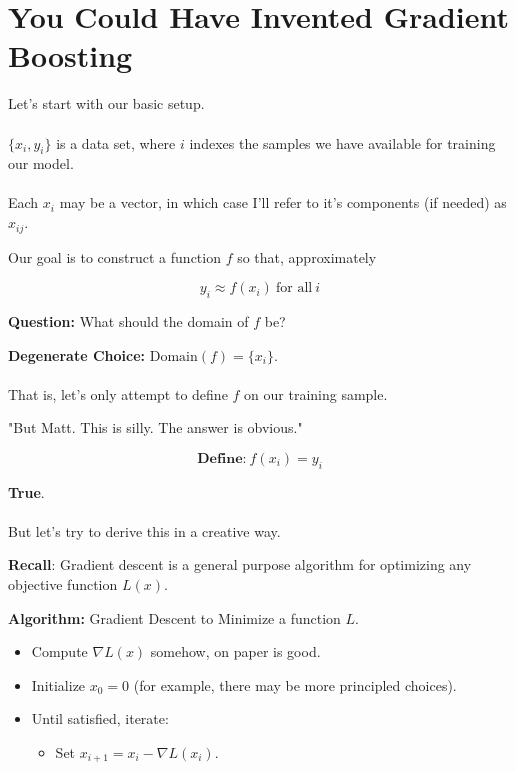 \section{You Could Have Invented Gradient Boosting}
%
\begin{frame}
Let's start with our basic setup.\\~\\

$\{ x_i, y_i \}$ is a data set, where $i$ indexes the samples we have available for training our model.\\~\\

Each $x_i$ may be a vector, in which case I'll refer to it's components (if needed) as $x_{ij}$.
\end{frame}
%
\begin{frame}
Our goal is to construct a function $f$ so that, approximately

$$ y_i \approx f(x_i) \ \text{for all} \ i $$

\end{frame}
%
\begin{frame}
\textbf{Question:} What should the domain of $f$ be?
\end{frame}
%
\begin{frame}
\textbf{Degenerate Choice:} $\text{Domain}(f) = \{x_i\}$.\\~\\

That is, let's only attempt to define $f$ on our training sample.
\end{frame}
%
\begin{frame}
\begin{center}
"But Matt.  This is silly.  The answer is obvious."
\end{center}

$$ \textbf{Define:} \ f(x_i) = y_i $$
\end{frame}
%
\begin{frame}
\textbf{True}.\\~\\

But let's try to derive this in a creative way.
\end{frame}
%
\begin{frame}
\textbf{Recall}: Gradient descent is a general purpose algorithm for optimizing any objective function $L(x)$.

\textbf{Algorithm:} Gradient Descent to Minimize a function $L$.

\begin{itemize}
  \item Compute $\nabla L(x)$ somehow, on paper is good.
  \item Initialize $x_0 = 0$ (for example, there may be more principled choices).
  \item Until satisfied, iterate: \begin{itemize}
    \item Set $x_{i+1} = x_i - \nabla L(x_i)$.
  \end{itemize}
\end{itemize}

\end{frame}
